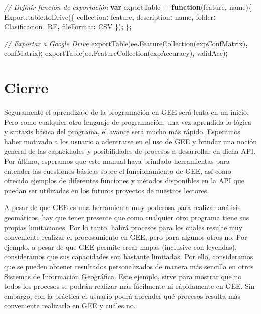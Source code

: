 \documentclass[
  12pt,
  letterpaper,
  twoside]{book}
\newenvironment{Shaded}{\begin{snugshade}}{\end{snugshade}}
\newcommand{\AttributeTok}[1]{\textcolor[rgb]{0.77,0.63,0.00}{#1}}
\newcommand{\CommentTok}[1]{\textcolor[rgb]{0.56,0.35,0.01}{\textit{#1}}}
\newcommand{\DataTypeTok}[1]{\textcolor[rgb]{0.13,0.29,0.53}{#1}}
\newcommand{\FunctionTok}[1]{\textcolor[rgb]{0.00,0.00,0.00}{#1}}
\newcommand{\KeywordTok}[1]{\textcolor[rgb]{0.13,0.29,0.53}{\textbf{#1}}}
\newcommand{\NormalTok}[1]{#1}
\newcommand{\OperatorTok}[1]{\textcolor[rgb]{0.81,0.36,0.00}{\textbf{#1}}}
\newcommand{\StringTok}[1]{\textcolor[rgb]{0.31,0.60,0.02}{#1}}
\begin{document}
\begin{Shaded}
\begin{Highlighting}[]
\CommentTok{// Definir función de exportación}
\KeywordTok{var}\NormalTok{ exportTable }\OperatorTok{=} \KeywordTok{function}\NormalTok{(feature}\OperatorTok{,}\NormalTok{ name)\{}
\NormalTok{  Export}\OperatorTok{.}\AttributeTok{table}\OperatorTok{.}\FunctionTok{toDrive}\NormalTok{(\{}
    \DataTypeTok{collection}\OperatorTok{:}\NormalTok{ feature}\OperatorTok{,}
    \DataTypeTok{description}\OperatorTok{:}\NormalTok{ name}\OperatorTok{,}
    \DataTypeTok{folder}\OperatorTok{:} \StringTok{\textquotesingle{}Clasificacion\_RF\textquotesingle{}}\OperatorTok{,}
    \DataTypeTok{fileFormat}\OperatorTok{:} \StringTok{\textquotesingle{}CSV\textquotesingle{}}
\NormalTok{ \})}\OperatorTok{;}
\NormalTok{\}}\OperatorTok{;}

\CommentTok{// Exportar a Google Drive}
\FunctionTok{exportTable}\NormalTok{(ee}\OperatorTok{.}\FunctionTok{FeatureCollection}\NormalTok{(expConfMatrix)}\OperatorTok{,} \StringTok{\textquotesingle{}confMatrix\textquotesingle{}}\NormalTok{)}\OperatorTok{;}
\FunctionTok{exportTable}\NormalTok{(ee}\OperatorTok{.}\FunctionTok{FeatureCollection}\NormalTok{(expAccuracy)}\OperatorTok{,} \StringTok{\textquotesingle{}validAcc\textquotesingle{}}\NormalTok{)}\OperatorTok{;}
\end{Highlighting}
\end{Shaded}

\newpage

\hypertarget{cierre}{%
\chapter{Cierre}\label{cierre}}

Seguramente el aprendizaje de la programación en GEE será lenta en un inicio. Pero como cualquier otro lenguaje de programación, una vez aprendida lo lógica y sintaxis básica del programa, el avance será mucho más rápido. Esperamos haber motivado a los usuario a adentrarse en el uso de GEE y brindar una noción general de las capacidades y posibilidades de procesos a desarrollar en dicha API. Por último, esperamos que este manual haya brindado herramientas para entender las cuestiones básicas sobre el funcionamiento de GEE, así como ofrecido ejemplos de diferentes funciones y métodos disponibles en la API que puedan ser utilizadas en los futuros proyectos de nuestros lectores.

A pesar de que GEE es una herramienta muy poderosa para realizar análisis geomáticos, hay que tener presente que como cualquier otro programa tiene sus propias limitaciones. Por lo tanto, habrá procesos para los cuales resulte muy conveniente realizar el procesamiento en GEE, pero para algunos otros no. Por ejemplo, a pesar de que GEE permite crear mapas (inclusive con leyendas), consideramos que sus capacidades son bastante limitadas. Por ello, consideramos que se pueden obtener resultados personalizados de manera más sencilla en otros Sistemas de Información Geográfica. Este ejemplo, sirve para mostrar que no todos los procesos se podrán realizar más fácilmente ni rápidamente en GEE. Sin embargo, con la práctica el usuario podrá aprender qué procesos resulta más conveniente realizarlo en GEE y cuáles no.
\end{document}
